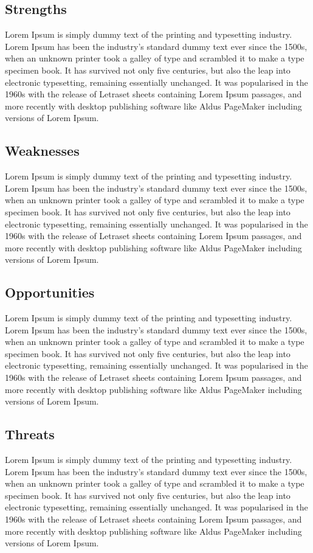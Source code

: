 \documentclass[12pt,a4paper]{report}
\begin{document}
\subsection{Strengths}
Lorem Ipsum is simply dummy text of the printing and typesetting industry. Lorem Ipsum has been the industry's standard dummy text ever since the 1500s, when an unknown printer took a galley of type and scrambled it to make a type specimen book. It has survived not only five centuries, but also the leap into electronic typesetting, remaining essentially unchanged. It was popularised in the 1960s with the release of Letraset sheets containing Lorem Ipsum passages, and more recently with desktop publishing software like Aldus PageMaker including versions of Lorem Ipsum.
\subsection{Weaknesses}
Lorem Ipsum is simply dummy text of the printing and typesetting industry. Lorem Ipsum has been the industry's standard dummy text ever since the 1500s, when an unknown printer took a galley of type and scrambled it to make a type specimen book. It has survived not only five centuries, but also the leap into electronic typesetting, remaining essentially unchanged. It was popularised in the 1960s with the release of Letraset sheets containing Lorem Ipsum passages, and more recently with desktop publishing software like Aldus PageMaker including versions of Lorem Ipsum.

\subsection{Opportunities}
Lorem Ipsum is simply dummy text of the printing and typesetting industry. Lorem Ipsum has been the industry's standard dummy text ever since the 1500s, when an unknown printer took a galley of type and scrambled it to make a type specimen book. It has survived not only five centuries, but also the leap into electronic typesetting, remaining essentially unchanged. It was popularised in the 1960s with the release of Letraset sheets containing Lorem Ipsum passages, and more recently with desktop publishing software like Aldus PageMaker including versions of Lorem Ipsum.
\subsection{Threats}
Lorem Ipsum is simply dummy text of the printing and typesetting industry. Lorem Ipsum has been the industry's standard dummy text ever since the 1500s, when an unknown printer took a galley of type and scrambled it to make a type specimen book. It has survived not only five centuries, but also the leap into electronic typesetting, remaining essentially unchanged. It was popularised in the 1960s with the release of Letraset sheets containing Lorem Ipsum passages, and more recently with desktop publishing software like Aldus PageMaker including versions of Lorem Ipsum.
\end{document}
